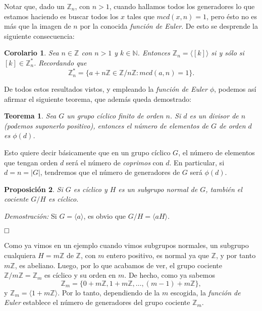 \documentclass[12pt]{article}
\newtheorem{theorem}{Teorema}[section]
\newtheorem{proposition}[theorem]{Proposición}
\newtheorem{corolario}{Corolario}[theorem]
\begin{document}
Notar que, dado un $\mathbb{Z}_{n}$, con $n>1$, cuando hallamos todos los generadores lo que estamos haciendo es buscar todos los $x$ tales que $mcd(x,n)=1$, pero ésto no es más que la imagen de $n$ por la conocida  \textit{función de Euler}. De esto se desprende la siguiente consecuencia:

\begin{corolario} Sea $n\in \mathbb{Z}$ con $n>1$ y $k \in \mathbb{N}$. Entonces $\mathbb{Z}_{n} = \langle \left[ k \right] \rangle$ si y sólo si $\left[ k \right] \in \mathbb{Z}_{n}^{\ast}$. Recordando que $$\mathbb{Z}_{n}^{\ast} = \lbrace a +n\mathbb{Z} \in \mathbb{Z} /n\mathbb{Z} : mcd(a,n)= 1 \rbrace.$$
\end{corolario}

De todos estos resultados vistos, y empleando la \textit{función de Euler} $\phi$, podemos así afirmar el siguiente teorema, que además queda demostrado:

\begin{theorem}
Sea $G$ un grupo cíclico finito de orden $n$. Si $d$ es un divisor de $n$ (podemos suponerlo positivo), entonces el número de elementos de $G$ de orden $d$ es $\phi(d)$.
\end{theorem}

Esto quiere decir básicamente que en un grupo cíclico $G$, el número de elementos que tengan orden $d$ será el número de \textit{coprimos} con $d$. En particular, si $d = n = |G|$, tendremos que el número de generadores de $G$ será $\phi(d)$.

\begin{proposition} Si $G$ es cíclico y $H$ es un subgrupo normal de $G$, también el cociente $G/H$ es cíclico.
\end{proposition}
\emph{Demostración: } Si $G = \langle a \rangle$, es obvio que $G/H = \langle aH \rangle$.

$\hfill \square$

Como ya vimos en un ejemplo cuando vimos subgrupos normales, un subgrupo cualquiera $H = m\mathbb{Z}$ de $\mathbb{Z}$, con $m$ entero positivo, es normal ya que $\mathbb{Z}$, y por tanto $m\mathbb{Z}$, es abeliano. Luego, por lo que acabamos de ver, el grupo cociente $\mathbb{Z}/m\mathbb{Z} = \mathbb{Z}_{m}$ es cíclico y su orden en $m$. De hecho, como ya sabemos $$\mathbb{Z}_{m} = \lbrace 0 + m\mathbb{Z}, 1 +m\mathbb{Z} , \ldots, (m-1) + m\mathbb{Z}\rbrace,$$ y $\mathbb{Z}_{m} = \langle 1 +m\mathbb{Z} \rangle$. Por lo tanto, dependiendo de la $m$ escogida, la \textit{función de Euler} establece el número de generadores del grupo cociente $\mathbb{Z}_{m}$.
\end{document}

